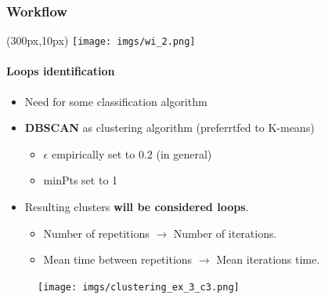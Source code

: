 \documentclass{beamer}
\begin{document}
\begin{frame}
\frametitle{Workflow}
\begin{textblock*}{5cm}(300px,10px) %
	\texttt{[image: imgs/wi\_2.png]}
\end{textblock*}
\framesubtitle{Loops identification}
\begin{multicols}{2}
\begin{itemize}
	\item Need for some classification algorithm
	\item \textbf{DBSCAN} as clustering algorithm (preferrtfed to K-means)
	\begin{itemize}
		\item $\epsilon$ empirically set to 0.2 (in general)
		\item minPts set to 1
	\end{itemize}
	\item Resulting clusters \textbf{will be considered loops}.
	\begin{itemize}
		\item Number of repetitions $\rightarrow$ Number of iterations.
		\item Mean time between repetitions $\rightarrow$ Mean iterations time.
	\end{itemize}
\end{itemize}
\columnbreak
\begin{figure}
	\texttt{[image: imgs/clustering\_ex\_3\_c3.png]}
\end{figure}
\end{multicols}
\end{frame}
\end{document}

